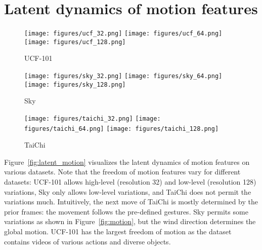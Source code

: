 \documentclass{article} \usepackage{iclr2022_conference,times}
\begin{document}
 
\clearpage
\section{Latent dynamics of motion features}
\label{appen:motion}

\begin{figure*}[h]
\centering\small
\begin{subfigure}{\textwidth}
\texttt{[image: figures/ucf\_32.png]}
\texttt{[image: figures/ucf\_64.png]}
\texttt{[image: figures/ucf\_128.png]}
\caption{UCF-101}
\end{subfigure}
\begin{subfigure}{\textwidth}
\texttt{[image: figures/sky\_32.png]}
\texttt{[image: figures/sky\_64.png]}
\texttt{[image: figures/sky\_128.png]}
\caption{Sky}
\end{subfigure}
\begin{subfigure}{\textwidth}
\texttt{[image: figures/taichi\_32.png]}
\texttt{[image: figures/taichi\_64.png]}
\texttt{[image: figures/taichi\_128.png]}
\caption{TaiChi}
\end{subfigure}
\caption{
Latent trajectories of the motion features on UCF-101, Sky, and TaiChi datasets. Resolution denotes the location of motion features injected into the progressive generator; lower-resolution controls the high-level semantics, and higher-resolution controls the low-level variations. Dot colors gradually changes from blue ($t=0$) to red ($t=1$), and 5 random motion vectors are sampled. The features are projected onto 2D space via principal component analysis (PCA) for visualization.
}\label{fig:latent_motion}
\end{figure*}

Figure~\ref{fig:latent_motion} visualizes the latent dynamics of motion features on various datasets. Note that the freedom of motion features vary for different datasets: UCF-101 allows high-level (resolution 32) and low-level (resolution 128) variations, Sky only allows low-level variations, and TaiChi does not permit the variations much.
Intuitively, the next move of TaiChi is mostly determined by the prior frames: the movement follows the pre-defined gestures. Sky permits some variations as shown in Figure~\ref{fig:motion}, but the wind direction determines the global motion. UCF-101 has the largest freedom of motion as the dataset contains videos of various actions and diverse objects.
\end{document}

